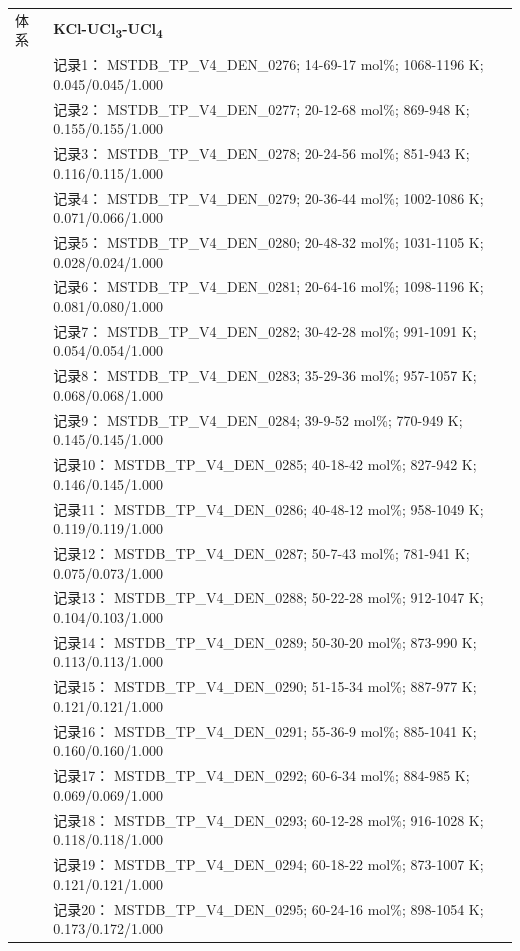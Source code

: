 \documentclass[12pt]{article}
\begin{document}
{\begin{longtable}[]{@{}
  >{\raggedright\arraybackslash}p{}
  >{\raggedright\arraybackslash}p{}@{}}
\midrule
体系 & \textbf{KCl-UCl\textsubscript{3}-UCl\textsubscript{4}} \\
 & 记录1： MSTDB\_TP\_V4\_DEN\_0276; 14-69-17 mol\%; 1068-1196 K; 0.045/0.045/1.000 \\
 & 记录2： MSTDB\_TP\_V4\_DEN\_0277; 20-12-68 mol\%; 869-948 K; 0.155/0.155/1.000 \\
 & 记录3： MSTDB\_TP\_V4\_DEN\_0278; 20-24-56 mol\%; 851-943 K; 0.116/0.115/1.000 \\
 & 记录4： MSTDB\_TP\_V4\_DEN\_0279; 20-36-44 mol\%; 1002-1086 K; 0.071/0.066/1.000 \\
 & 记录5： MSTDB\_TP\_V4\_DEN\_0280; 20-48-32 mol\%; 1031-1105 K; 0.028/0.024/1.000 \\
 & 记录6： MSTDB\_TP\_V4\_DEN\_0281; 20-64-16 mol\%; 1098-1196 K; 0.081/0.080/1.000 \\
 & 记录7： MSTDB\_TP\_V4\_DEN\_0282; 30-42-28 mol\%; 991-1091 K; 0.054/0.054/1.000 \\
 & 记录8： MSTDB\_TP\_V4\_DEN\_0283; 35-29-36 mol\%; 957-1057 K; 0.068/0.068/1.000 \\
 & 记录9： MSTDB\_TP\_V4\_DEN\_0284; 39-9-52 mol\%; 770-949 K; 0.145/0.145/1.000 \\
 & 记录10： MSTDB\_TP\_V4\_DEN\_0285; 40-18-42 mol\%; 827-942 K; 0.146/0.145/1.000 \\
 & 记录11： MSTDB\_TP\_V4\_DEN\_0286; 40-48-12 mol\%; 958-1049 K; 0.119/0.119/1.000 \\
 & 记录12： MSTDB\_TP\_V4\_DEN\_0287; 50-7-43 mol\%; 781-941 K; 0.075/0.073/1.000 \\
 & 记录13： MSTDB\_TP\_V4\_DEN\_0288; 50-22-28 mol\%; 912-1047 K; 0.104/0.103/1.000 \\
 & 记录14： MSTDB\_TP\_V4\_DEN\_0289; 50-30-20 mol\%; 873-990 K; 0.113/0.113/1.000 \\
 & 记录15： MSTDB\_TP\_V4\_DEN\_0290; 51-15-34 mol\%; 887-977 K; 0.121/0.121/1.000 \\
 & 记录16： MSTDB\_TP\_V4\_DEN\_0291; 55-36-9 mol\%; 885-1041 K; 0.160/0.160/1.000 \\
 & 记录17： MSTDB\_TP\_V4\_DEN\_0292; 60-6-34 mol\%; 884-985 K; 0.069/0.069/1.000 \\
 & 记录18： MSTDB\_TP\_V4\_DEN\_0293; 60-12-28 mol\%; 916-1028 K; 0.118/0.118/1.000 \\
 & 记录19： MSTDB\_TP\_V4\_DEN\_0294; 60-18-22 mol\%; 873-1007 K; 0.121/0.121/1.000 \\
 & 记录20： MSTDB\_TP\_V4\_DEN\_0295; 60-24-16 mol\%; 898-1054 K; 0.173/0.172/1.000 \\

\end{longtable}}
\end{document}
